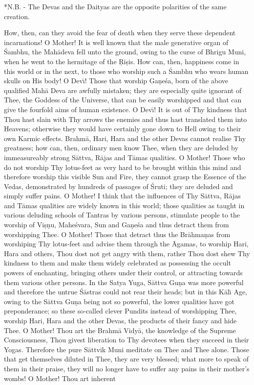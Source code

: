 *N.B. - The Devas and the Daityas are the opposite polarities of the same creation.

How, then, can they avoid the fear of death when they serve these dependent incarnations! O Mother! It is well known that the male generative organ of \'Sambhu, the Mah\=adeva fell unto the ground, owing to the curse of Bhrigu Muni, when he went to the hermitage of the \d{R}i\d{s}is. How can, then, happiness come in this world or in the next, to those who worship such a \'Sambhu who wears human skulls on His body! O Dev\={\i}! Those that worship Ga\d{n}e\'sa, born of the above qualified Mah\=a Deva are awfully mistaken; they are especially quite ignorant of Thee, the Goddess of the Universe, that can be easily worshipped and that can give the fourfold aims of human existence. O Dev\={\i}! It is out of Thy kindness that Thou hast slain with Thy arrows the enemies and thus hast translated them into Heavens; otherwise they would have certainly gone down to Hell owing to their own Karmic effects. Brahm\=a, Hari, Hara and the other Devas cannot realise Thy greatness; how can, then, ordinary men know Thee, when they are deluded by immeasureably strong S\=attva, R\=ajas and T\=amas qualities. O Mother! Those who do not worship Thy lotus-feet as very hard to be brought within this mind and therefore worship this visible Sun and Fire, they cannot grasp the Essence of the Vedas, demonstrated by hundreds of passages of \'Sruti; they are deluded and simply suffer pains. O Mother! I think that the influences of Thy S\=attva, R\=ajas and T\=amas qualities are widely known in this world; those qualities as taught in various deluding schools of Tantras by various persons, stimulate people to the worship of Vi\d{s}\d{n}u, Mahe\'svara, Sun and Ga\d{n}e\'sa and thus detract them from worshipping Thee. O Mother! Those that detract thus the Br\=ahma\d{n}as from worshiping Thy lotus-feet and advise them through the \=Agamas, to worship Hari, Hara and others, Thou dost not get angry with them, rather Thou dost shew Thy kindness to them and make them widely celebrated as possessing the occult powers of enchanting, bringing others under their control, or attracting towards them various other persons. In the Satya Yuga, S\=attva Gu\d{n}a was more powerful and therefore the untrue \'S\=astras could not rear their heads; but in this K\=al\={\i} Age, owing to the S\=attva Gu\d{n}a being not so powerful, the lower qualities have got preponderance; so these so-called clever Pundits instead of worshipping Thee, worship Hari, Hara and the other Devas, the products of their fancy and hide Thee. O Mother! Thou art the Brahm\=a Vidy\=a, the knowledge of the Supreme Consciousness, Thou givest liberation to Thy devotees when they succeed in their Yogas. Therefore the pure S\=attvik Muni meditate on Thee and Thee alone. Those that get themselves diluted in Thee, they are very blessed; what more to speak of them in their praise, they will no longer have to suffer any pains in their mother's wombs! O Mother! Thou art inherent

